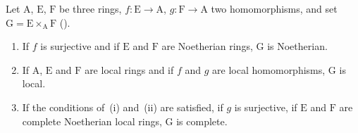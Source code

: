 \begin{lemma}[19.3.2.1]
\label{IV.19.3.2.1}
Let $\mathrm{A}$, $\mathrm{E}$, $\mathrm{F}$ be three rings, $f:\mathrm{E}\to\mathrm{A}$, $g:\mathrm{F}\to\mathrm{A}$ two homomorphisms, and set $\mathrm{G}=\mathrm{E}\times_{\mathrm{A}}\mathrm{F}$ ().
\begin{enumerate}[label=(\roman*)]
  \item If $f$ is surjective and if $\mathrm{E}$ and $\mathrm{F}$ are Noetherian rings, $\mathrm{G}$ is Noetherian.
  \item If $\mathrm{A}$, $\mathrm{E}$ and $\mathrm{F}$ are local rings and if $f$ and $g$ are local homomorphisms, $\mathrm{G}$ is local.
  \item If the conditions of~(i) and~(ii) are satisfied, if $g$ is surjective, if $\mathrm{E}$ and $\mathrm{F}$ are complete Noetherian local rings, $\mathrm{G}$ is complete.
\end{enumerate}
\end{lemma}

